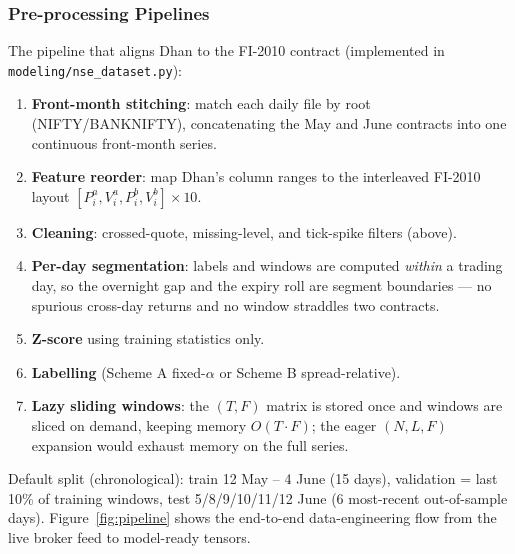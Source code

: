 \documentclass[11pt]{article}
\begin{document}
\subsubsection{Pre-processing Pipelines}
The pipeline that aligns Dhan to the FI-2010 contract (implemented in \texttt{modeling/nse\_dataset.py}):
\begin{enumerate}[nosep]
  \item \textbf{Front-month stitching}: match each daily file by root (NIFTY/BANKNIFTY), concatenating the
        May and June contracts into one continuous front-month series.
  \item \textbf{Feature reorder}: map Dhan's column ranges to the interleaved FI-2010 layout
        $[P^a_i,V^a_i,P^b_i,V^b_i]\times 10$.
  \item \textbf{Cleaning}: crossed-quote, missing-level, and tick-spike filters (above).
  \item \textbf{Per-day segmentation}: labels and windows are computed \emph{within} a trading day, so the
        overnight gap and the expiry roll are segment boundaries --- no spurious cross-day returns and no
        window straddles two contracts.
  \item \textbf{Z-score} using training statistics only.
  \item \textbf{Labelling} (Scheme A fixed-$\alpha$ or Scheme B spread-relative).
  \item \textbf{Lazy sliding windows}: the $(T,F)$ matrix is stored once and windows are sliced on demand,
        keeping memory $O(T\cdot F)$; the eager $(N,L,F)$ expansion would exhaust memory on the
        full series.
\end{enumerate}
Default split (chronological): train 12 May -- 4 June (15 days), validation = last 10\% of training
windows, test 5/8/9/10/11/12 June (6 most-recent out-of-sample days). Figure~\ref{fig:pipeline} shows the
end-to-end data-engineering flow from the live broker feed to model-ready tensors.
\end{document}
